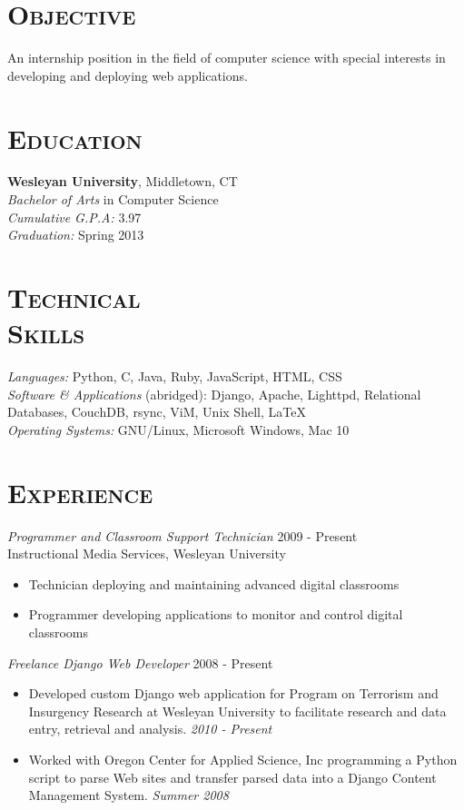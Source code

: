 \documentclass[margin]{res}
\begin{document}
\begin{resume}
\section{\textsc{Objective}} An internship position in the field of computer science with special interests in developing and deploying web applications.

\section{\textsc{Education}} {\bf Wesleyan University}, Middletown, CT \\ {\sl Bachelor of Arts} in Computer Science \\
    {\sl Cumulative G.P.A:} 3.97 \\
    {\sl Graduation:} Spring 2013
 
 
\section{\textsc{Technical \\ Skills}}
    {\sl Languages:} Python, C, Java, Ruby, JavaScript, HTML, CSS \\
    {\sl Software \& Applications} (abridged): Django, Apache, Lighttpd, Relational Databases, CouchDB, rsync, ViM, Unix Shell, \LaTeX \\
    {\sl Operating Systems:} GNU/Linux, Microsoft Windows, Mac 10

\section{\textsc{Experience}}
    {\sl Programmer and Classroom Support Technician} \hfill 2009 - Present \\
    Instructional Media Services, Wesleyan University
    \begin{itemize}  \itemsep -2pt %
        \item Technician deploying and maintaining advanced digital classrooms
        \item Programmer developing applications to monitor and control digital classrooms
    \end{itemize}

    {\sl Freelance Django Web Developer} \hfill 2008 - Present
    \begin{itemize}  \itemsep -2pt %
        \item Developed custom Django web application for Program on Terrorism and Insurgency Research at Wesleyan University to facilitate research and data entry, retrieval and analysis. {\sl 2010 - Present}
        \item Worked with Oregon Center for Applied Science, Inc programming a Python script to parse Web sites and transfer parsed data into a Django Content Management System. {\sl Summer 2008}
    \end{itemize}


\end{resume}
\end{document}
